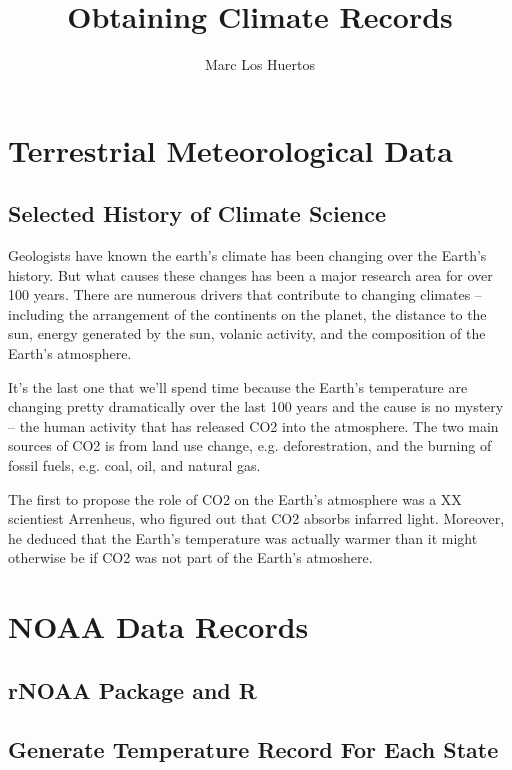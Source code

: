 \documentclass{article}\usepackage[]{graphicx}\usepackage[]{color}
\title{Obtaining Climate Records}
\author{Marc Los Huertos}
\begin{document}
\maketitle

\section{Terrestrial Meteorological Data}

\subsection{Selected History of Climate Science}

Geologists have known the earth's climate has been changing over the Earth's history. But what causes these changes has been a major research area for over 100 years. There are numerous drivers that contribute to changing climates -- including the arrangement of the continents on the planet, the distance to the sun, energy generated by the sun, volanic activity, and the composition of the Earth's atmosphere. 

It's the last one that we'll spend time because the Earth's temperature are changing pretty dramatically over the last 100 years and the cause is no mystery -- the human activity that has released CO2 into the atmosphere. The two main sources of CO2 is from land use change, e.g. deforestration, and the burning of fossil fuels, e.g. coal, oil, and natural gas. 

The first to propose the role of CO2 on the Earth's atmosphere was a XX scientiest Arrenheus, who figured out that CO2 absorbs infarred light. Moreover, he deduced that the Earth's temperature was actually warmer than it might otherwise be if CO2 was not part of the Earth's atmoshere. 


\section{NOAA Data Records}


\subsection{rNOAA Package and R}

\subsection{Generate Temperature Record For Each State}
\end{document}
